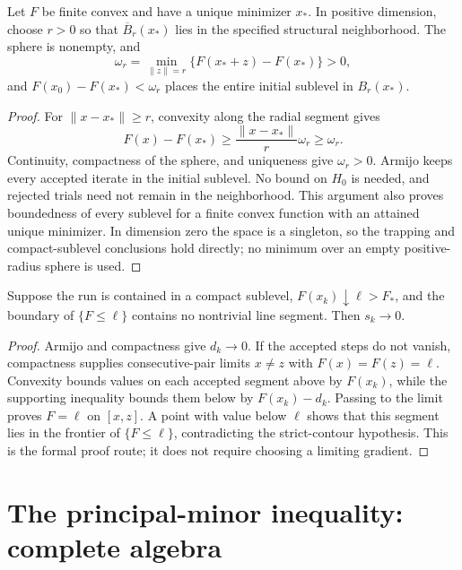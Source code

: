 \begin{lemma}\label{M:localization}
Let $F$ be finite convex and have a unique minimizer $x_*$. In positive dimension, choose $r>0$ so that $\overline B_r(x_*)$ lies in the specified structural neighborhood. The sphere is nonempty, and
\[
 \omega_r=\min_{\|z\|=r}\{F(x_*+z)-F(x_*)\}>0,
\]
and $F(x_0)-F(x_*)<\omega_r$ places the entire initial sublevel in $B_r(x_*)$.
\end{lemma}
\begin{proof}
For $\|x-x_*\|\ge r$, convexity along the radial segment gives
\[
 F(x)-F(x_*)\ge\frac{\|x-x_*\|}{r}\omega_r\ge\omega_r.
\]
Continuity, compactness of the sphere, and uniqueness give $\omega_r>0$. Armijo keeps every accepted iterate in the initial sublevel. No bound on $H_0$ is needed, and rejected trials need not remain in the neighborhood. This argument also proves boundedness of every sublevel for a finite convex function with an attained unique minimizer. In dimension zero the space is a singleton, so the trapping and compact-sublevel conclusions hold directly; no minimum over an empty positive-radius sphere is used.
\end{proof}

\begin{lemma}\label{M:strictcontours}
Suppose the run is contained in a compact sublevel, $F(x_k)\downarrow\ell>F_*$, and the boundary of $\{F\le\ell\}$ contains no nontrivial line segment. Then $s_k\to0$.
\end{lemma}
\begin{proof}
Armijo and compactness give $d_k\to0$. If the accepted steps do not vanish, compactness supplies consecutive-pair limits $x\ne z$ with $F(x)=F(z)=\ell$. Convexity bounds values on each accepted segment above by $F(x_k)$, while the supporting inequality bounds them below by $F(x_k)-d_k$. Passing to the limit proves $F=\ell$ on $[x,z]$. A point with value below $\ell$ shows that this segment lies in the frontier of $\{F\le\ell\}$, contradicting the strict-contour hypothesis. This is the formal proof route; it does not require choosing a limiting gradient.
\end{proof}



\section{The principal-minor inequality: complete algebra}
\label{M:principal}

